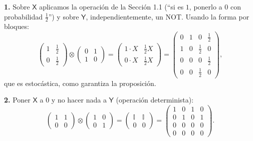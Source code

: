 \documentclass[11pt, a4paper, twoside, openright]{report}
\begin{document}
\begin{tcolorbox}[colback=cyan!5!white,colframe=cyan!75!black,title=\textbf{Ejemplos: Operaciones independientes sobre dos bits}]
\textbf{1.} Sobre $\mathsf{X}$ aplicamos la operación de la Sección 1.1 (``si es $1$, ponerlo a $0$ con probabilidad $\frac12$'') y sobre $\mathsf{Y}$, independientemente, un NOT. Usando la forma por bloques:
\[
\begin{pmatrix} 1&\frac12\\0&\frac12 \end{pmatrix}\otimes\begin{pmatrix} 0&1\\1&0 \end{pmatrix}
= \begin{pmatrix} 1\cdot X & \frac12 X \\ 0\cdot X & \frac12 X \end{pmatrix}
= \begin{pmatrix} 0&1&0&\frac12\\1&0&\frac12&0\\0&0&0&\frac12\\0&0&\frac12&0 \end{pmatrix},
\]
que es estocástica, como garantiza la proposición.

\textbf{2.} Poner $\mathsf{X}$ a $0$ y no hacer nada a $\mathsf{Y}$ (operación determinista):
\[
\begin{pmatrix} 1&1\\0&0 \end{pmatrix}\otimes\begin{pmatrix} 1&0\\0&1 \end{pmatrix}
= \begin{pmatrix} \mathbb{I} & \mathbb{I} \\ 0 & 0 \end{pmatrix}
= \begin{pmatrix} 1&0&1&0\\0&1&0&1\\0&0&0&0\\0&0&0&0 \end{pmatrix}.
\]
\end{tcolorbox}
\end{document}
